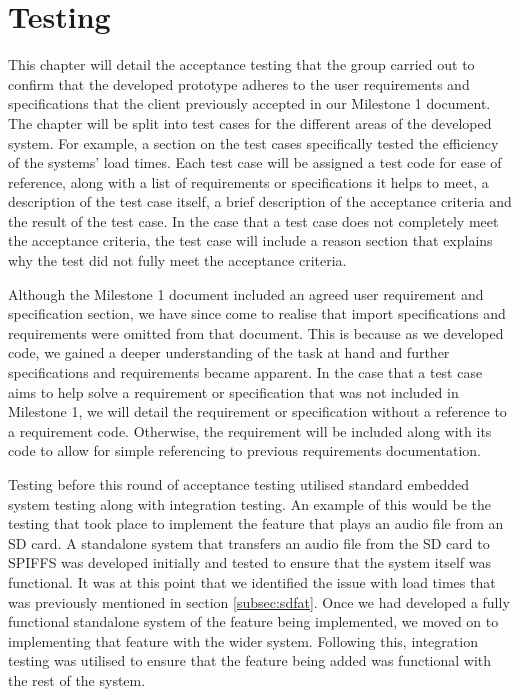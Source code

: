 \chapter{Testing}
\label{ch:testing}

    This chapter will detail the acceptance testing that the group carried out to confirm that the developed prototype adheres to the user requirements and specifications that the client previously accepted in our Milestone 1 document. The chapter will be split into test cases for the different areas of the developed system. For example, a section on the test cases specifically tested the efficiency of the systems' load times. Each test case will be assigned a test code for ease of reference, along with a list of requirements or specifications it helps to meet, a description of the test case itself, a brief description of the acceptance criteria and the result of the test case. In the case that a test case does not completely meet the acceptance criteria, the test case will include a reason section that explains why the test did not fully meet the acceptance criteria.
    
    Although the Milestone 1 document included an agreed user requirement and specification section, we have since come to realise that import specifications and requirements were omitted from that document. This is because as we developed code, we gained a deeper understanding of the task at hand and further specifications and requirements became apparent. In the case that a test case aims to help solve a requirement or specification that was not included in Milestone 1, we will detail the requirement or specification without a reference to a requirement code. Otherwise, the requirement will be included along with its code to allow for simple referencing to previous requirements documentation.

    Testing before this round of acceptance testing utilised standard embedded system testing along with integration testing. An example of this would be the testing that took place to implement the feature that plays an audio file from an SD card. A standalone system that transfers an audio file from the SD card to SPIFFS was developed initially and tested to ensure that the system itself was functional. It was at this point that we identified the issue with load times that was previously mentioned in section \ref{subsec:sdfat}. Once we had developed a fully functional standalone system of the feature being implemented, we moved on to implementing that feature with the wider system. Following this, integration testing was utilised to ensure that the feature being added was functional with the rest of the system.

